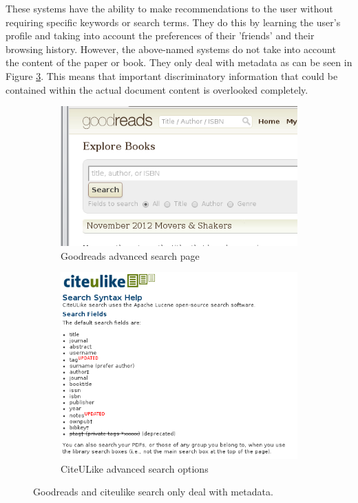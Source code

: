 These systems have the ability to make recommendations to the user without
requiring specific keywords or search terms. They do this by learning the
user's profile and taking into account the preferences of their 'friends' and
their browsing history. However, the above-named systems do not take into
account the content of the paper or book. They only deal with metadata as can
be seen in Figure \ref{fig:social_searches}. This means that important
discriminatory information that could be contained within the actual document
content is overlooked completely. 

\begin{figure}[!hbt]
        \centering
        \begin{subfigure}[b]{0.50\textwidth}
                \centering
                \includegraphics[width=\textwidth]{images/goodreads_search.png}
                \caption{Goodreads advanced search page}
                \label{fig:goodreads_search}
        \end{subfigure}%
        \begin{subfigure}[b]{0.50\textwidth}
                \centering
                \includegraphics[width=\textwidth]{images/citeulike_search.png}
                \caption{CiteULike advanced search options}
                \label{fig:citeulike_search}
        \end{subfigure}

        \caption{Goodreads and citeulike search only deal with metadata.}
        \label{fig:social_searches}
\end{figure}

